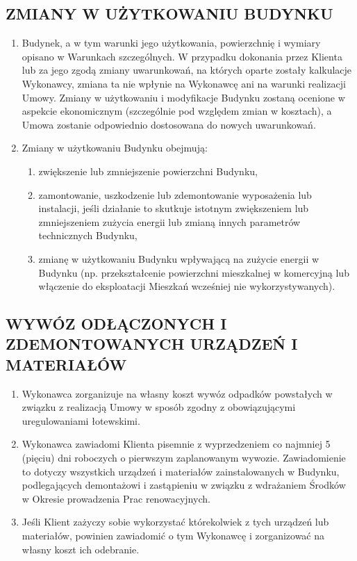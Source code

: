 \begin{multicols}{2}
\subsection{ZMIANY W UŻYTKOWANIU BUDYNKU}
\begin{enumerate}
	\item Budynek, a w tym warunki jego użytkowania, powierzchnię i wymiary opisano w Warunkach szczególnych. W przypadku dokonania przez Klienta lub za jego zgodą zmiany uwarunkowań, na których oparte zostały kalkulacje Wykonawcy, zmiana ta nie wpłynie na Wykonawcę ani na warunki realizacji Umowy. Zmiany w użytkowaniu i modyfikacje Budynku zostaną ocenione w aspekcie ekonomicznym (szczególnie pod względem zmian w kosztach), a Umowa zostanie odpowiednio dostosowana do nowych uwarunkowań.

	\item Zmiany w użytkowaniu Budynku obejmują:
	\begin{enumerate}
		\item zwiększenie lub zmniejszenie powierzchni Budynku,
		\item zamontowanie, uszkodzenie lub zdemontowanie wyposażenia lub instalacji, jeśli działanie to skutkuje istotnym zwiększeniem lub zmniejszeniem zużycia energii lub zmianą innych parametrów technicznych Budynku,
		\item zmianę w użytkowaniu Budynku wpływającą na zużycie energii w Budynku (np. przekształcenie powierzchni mieszkalnej w komercyjną lub włączenie do eksploatacji Mieszkań wcześniej nie wykorzystywanych).
	\end{enumerate}
\end{enumerate}

\subsection{WYWÓZ ODŁĄCZONYCH I ZDEMONTOWANYCH URZĄDZEŃ I MATERIAŁÓW}
\begin{enumerate}
	\item Wykonawca zorganizuje na własny koszt wywóz odpadków powstałych w związku z realizacją Umowy w sposób zgodny z obowiązującymi uregulowaniami łotewskimi.
	\item Wykonawca zawiadomi Klienta pisemnie z wyprzedzeniem co najmniej 5 (pięciu) dni roboczych o pierwszym zaplanowanym wywozie. Zawiadomienie to dotyczy wszystkich urządzeń i materiałów zainstalowanych w Budynku, podlegających demontażowi i zastąpieniu w związku z wdrażaniem Środków w Okresie prowadzenia Prac renowacyjnych.
	\item Jeśli Klient zażyczy sobie wykorzystać którekolwiek z tych urządzeń lub materiałów, powinien zawiadomić o tym Wykonawcę i zorganizować na własny koszt ich odebranie.
\end{enumerate}


\end{multicols}
